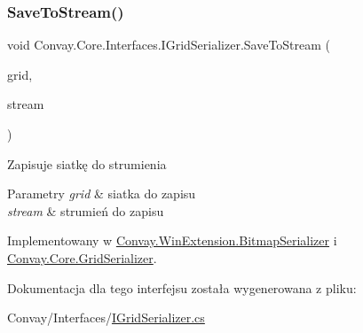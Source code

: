 \subsubsection{\texorpdfstring{Save\+To\+Stream()}{SaveToStream()}}
{\footnotesize\ttfamily void Convay.\+Core.\+Interfaces.\+I\+Grid\+Serializer.\+Save\+To\+Stream (\begin{DoxyParamCaption}\item[{\hyperlink{interface_convay_1_1_core_1_1_interfaces_1_1_i_grid}{I\+Grid}}]{grid,  }\item[{Stream}]{stream }\end{DoxyParamCaption})}



Zapisuje siatkę do strumienia 


\begin{DoxyParams}{Parametry}
{\em grid} & siatka do zapisu\\
\hline
{\em stream} & strumień do zapisu\\
\hline
\end{DoxyParams}


Implementowany w \hyperlink{class_convay_1_1_win_extension_1_1_bitmap_serializer_ac5d034f09f4bdeed5230507e3ad8d683}{Convay.\+Win\+Extension.\+Bitmap\+Serializer} i \hyperlink{class_convay_1_1_core_1_1_grid_serializer_a3c29cdb004954acf74fb049393786f65}{Convay.\+Core.\+Grid\+Serializer}.



Dokumentacja dla tego interfejsu została wygenerowana z pliku\+:\begin{DoxyCompactItemize}
\item 
Convay/\+Interfaces/\hyperlink{_i_grid_serializer_8cs}{I\+Grid\+Serializer.\+cs}\end{DoxyCompactItemize}
